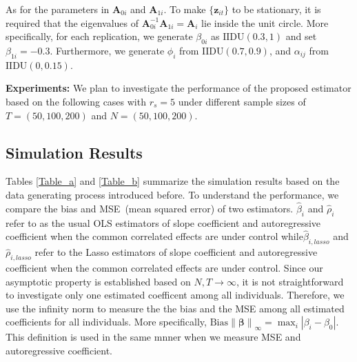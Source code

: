 \documentclass[11pt,a4paper]{article}
\newcommand{\Bbeta}{\boldsymbol{\beta}}
\newcommand{\MBA}{\mathbf{A}}
\newcommand{\MBz}{\mathbf{z}}
\theoremstyle{definition}
\newcommand{\norm}[1]{\left\lVert#1\right\rVert}
\begin{document}
As for the parameters in $\MBA_{0i}$ and $\MBA_{1i}$. To make $\{\MBz_{it}\}$ to be stationary, it is required that the eigenvalues of $\MBA_{0i}^{-1}\MBA_{1i}=\MBA_{i}$ lie inside the unit circle. More specifically, for each replication, we generate $\beta_{0i}$ as $\mathrm{IIDU}(0.3,1)$ and set
$\beta_{1i}=-0.3$. Furthermore, we generate $\phi_i$ from $\mathrm{IIDU}(0.7,0.9)$, and $\alpha_{ij}$ from $\mathrm{IIDU}(0,0.15)$.

\noindent
\textbf{Experiments:} We plan to investigate the performance of the proposed estimator based on the following cases with $r_s=5$ under different sample sizes of $T=(50,100,200)$ and $N=(50,100,200)$. 


\subsection{Simulation Results}

Tables \ref{Table_a} and \ref{Table_b} summarize the simulation results based on the data generating process introduced before. To understand the performance, we compare the bias and MSE~(mean squared error) of two estimators. $\hat{\beta}_i$ and $\hat{\rho}_i$ refer to as the usual OLS estimators of slope coefficient and autoregressive coefficient when the common correlated effects are under control while$ \hat{\beta}_{i,lasso}$ and $\hat{\rho}_{i,lasso}$ refer to the Lasso estimators of slope coefficient and autoregressive coefficient when the common correlated effects are under control. Since our asymptotic property is established based on $N,T\rightarrow\infty$, it is not straightforward to investigate only one estimated coefficent among all individuals. Therefore, we use the infinity norm to measure the the bias and the MSE among all estimated coefficients for all individuals. More specifically, $\mathrm{Bias}\norm{\Bbeta}_{\infty}=\max_i|\beta_i-\beta_0|$. This definition is used in the same mnner when we measure MSE and autoregressive coefficient.
\end{document}
